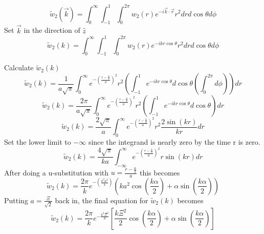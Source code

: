 \documentclass[letterpaper,twocolumn,amsmath,amssymb,prb]{revtex4-1}
\begin{document}
\begin{widetext}
\begin{equation}{\widetilde{w}_2(\vec{k})=\int_{0}^{\infty}\int_{-1}^{1}\int_{0}^{2\pi}w_2(r)e^{-i\vec{k}\cdot{\vec{r}}}r^2d{r}d{\cos\theta}d{\phi}}\end{equation}
Set $\vec{k}$ in the direction of $\hat{z}$ 
\begin{equation}{\widetilde{w}_2(k)=\int_{0}^{\infty}\int_{-1}^{1}\int_{0}^{2\pi}w_2(r)e^{-ikr\cos\theta}r^2d{r}d{\cos\theta}d{\phi}}\end{equation}

\noindent Calculate $\widetilde{w}_2(k)$ 
\begin{equation}{\widetilde{w}_2(k)=\frac{1}{a\sqrt{\pi}}\int_{0}^{\infty}e^{-\left(\frac{r-\frac{\alpha}{2}}{a}\right)^2}r^2\left(\int_{-1}^{1}e^{-ikr\cos\theta}d{\cos\theta}\left(\int_{0}^{2\pi}d{\phi}\right)\right)d{r}}\end{equation}
\[{}\]
\begin{equation}{\widetilde{w}_2(k)=\frac{2\pi}{a\sqrt{\pi}}\int_{0}^{\infty}e^{-\left(\frac{r-\frac{\alpha}{2}}{a}\right)^2}r^2\left(\int_{-1}^{1}e^{-ikr\cos\theta}d{\cos\theta}\right)d{r}}\end{equation}
\begin{equation}{\widetilde{w}_2(k)=\frac{2\sqrt{\pi}}{a}\int_{0}^{\infty}e^{-\left(\frac{r-\frac{\alpha}{2}}{a}\right)^2}r^2\frac{2\sin(kr)}{kr}d{r}}\end{equation}
Set the lower limit to $-\infty$  since the integrand is nearly zero by the time r is zero.
\begin{equation}{\widetilde{w}_2(k)=\frac{4\sqrt{\pi}}{ka}\int_{-\infty}^{\infty}e^{-\left(\frac{r-\frac{\alpha}{2}}{a}\right)^2}r\sin(kr)d{r}}\end{equation}
After doing a u-substitution with $u=\frac{r-\frac{\alpha}{2}}{a}$ this becomes
\begin{equation}{\widetilde{w}_2(k)=\frac{2\pi}{k}e^{-\left(\frac{k^2a^2}{4}\right)}\left(ka^2\cos\left(\frac{k\alpha}{2}\right)+\alpha\sin\left(\frac{k\alpha}{2}\right)\right)}\end{equation}
Putting $a=\frac{\Xi}{\sqrt{2}}$ back in, the final equation for $\widetilde{w}_2(k)$ becomes
\begin{equation}{\widetilde{w}_2(k)=\frac{2\pi}{k}e^{-\frac{k^2\Xi^2}{8}}\left[\frac{k\Xi^2}{2}\cos\left(\frac{k\alpha}{2}\right)+\alpha\sin\left(\frac{k\alpha}{2}\right)\right]}\end{equation}

\[{}\]


\end{widetext}
\end{document}
